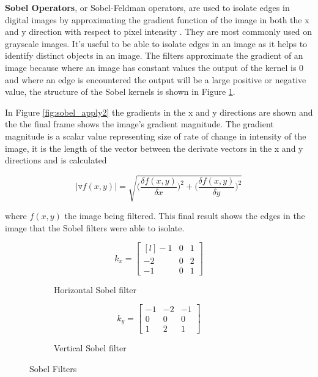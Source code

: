 \textbf{Sobel Operators}, or Sobel-Feldman operators, are used to isolate edges in digital images by approximating the gradient function of the image in both the x and y direction with respect to pixel intensity \cite{sobel}. They are most commonly used on grayscale images. It's useful to be able to isolate edges in an image as it helps to identify distinct objects in an image. The filters approximate the gradient of an image because where an image has constant values the output of the kernel is 0 and where an edge is encountered the output will be a large positive or negative value, the structure of the Sobel kernels is shown in Figure \ref{fig:sobel_filters}.

In Figure \ref{fig:sobel_apply2} the gradients in the x and y directions are shown and the the final frame shows the image's gradient magnitude. The gradient magnitude is a scalar value representing size of rate of change in intensity of the image, it is the length of the vector between the derivate vectors in the x and y directions and is calculated 

\begin{equation}
|\triangledown f(x,y)| = \sqrt{\bigg (\frac{\delta f(x,y)}{\delta x} \bigg )^2 + \bigg (\frac{\delta f(x,y)}{\delta y} \bigg )^2}
\end{equation}

where $f(x,y)$ the image being filtered. This final result shows the edges in the image that the Sobel filters were able to isolate.

\begin{figure}[H]
    \begin{subfigure}[b]{0.49\textwidth}
      \[k_x =
      \begin{bmatrix*}[l]
       -1 & 0 & 1 \\
        -2 & 0 & 2 \\
        -1 & 0 & 1
      \end{bmatrix*}
      \]
      \caption{Horizontal Sobel filter}
  \end{subfigure}
  \begin{subfigure}[b]{0.49\textwidth}
    \[ k_y = 
      \begin{bmatrix}
        -1 & -2 & -1 \\
        0 & 0 & 0 \\
        1 & 2 & 1
      \end{bmatrix}
      \]
      \caption{Vertical Sobel filter}  
  \end{subfigure}
      \caption{Sobel Filters}
      \label{fig:sobel_filters}
  \end{figure}

